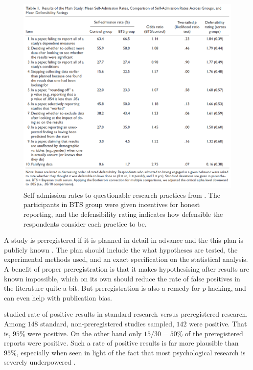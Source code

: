 \begin{figure}
\noindent \begin{centering}
\includegraphics[scale=0.4]{chunks/john2012}
\par\end{centering}
\caption{\label{fig:john2012}Self-admission rates to questionable research practices from \cite{John2012-xp}. The participants in BTS group were given incentives for honest reporting, and the defensibility rating indicates how defensible the respondents consider each practice to be.}
\end{figure}

A study is preregistered if it is planned in detail in advance and the this plan is publicly known \parencite{Van_t_Veer2016-fo}. The plan should include the what hypotheses are tested, the experimental methods used, and an exact specification on the statistical analysis. A benefit of proper preregistration is that it makes hypothesising after results are known impossible, which on its own should reduce the rate of false positives in the literature quite a bit. But preregistration is also a remedy for \emph{p}-hacking, and can even help with publication bias.

\cite{Scheel2020-sq} studied rate of positive results in standard research versus preregistered research. Among $148$ standard, non-preregistered studies sampled, $142$ were positive. That is, $95\%$ were positive. On the other hand only $15/30=50\%$ of the preregistered reports were positive. Such a rate of positive results is far more plausible than $95\%$, especially when seen in light of the fact that most psychological research is severely underpowered \parencite{Sedlmeier1989-zz}.


